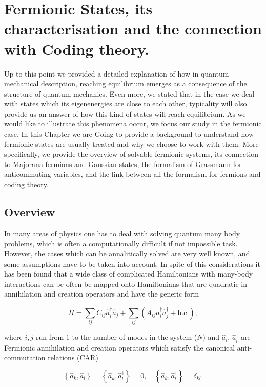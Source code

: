 \chapter{ Fermionic States, its characterisation and the connection with Coding theory.}
Up to this point we provided a detailed explanation of how in quantum mechanical description, reaching equilibrium emerges as a consequence of the structure of quantum mechanics. Even more, we stated that in the case we deal with states which its eigenenergies are close to each other, typicality will also provide us an answer of how this kind of states will reach equilibrium. As we would like to illustrate this phenomena occur, we focus our study in the fermionic case. In this Chapter we are Going to provide a background to understand how fermionic states are usually treated and why we choose to work with them. More specifically, we provide the overview of solvable fermionic systems, its connection to Majorana fermions and Gaussian states, the formalism of Grassmann for anticommuting variables, and the link between all the formalism for fermions and coding theory.\\
\section{Overview}
In many areas of physics one has to deal with solving quantum many body problems, which is often a computationally difficult if not impossible task. However, the cases which can be annalitically solved are very well known, and some assumptions have to be taken into account. In spite of this considerations it has been found that a wide class of complicated Hamiltonians with many-body interactions can be often be mapped onto Hamiltonians that are quadratic in annihilation and creation operators and have the generic form \cite{botero_bcs-like_2004}

\begin{equation}
\hat{H}=\sum_{i j} C_{i j} \hat{a}_{i}^{\dagger} \hat{a}_{j}+\sum_{i j}\left(A_{i j} \hat{a}_{i}^{\dagger}\hat{a}_{j}^{\dagger}+\mathrm{h.c.}\right),
\label{CH2:QuadraticHamiltonian}
\end{equation}

where $i,j$ run from $1$ to the number of modes in the system ($N$) and $\hat{a}_i$, $\hat{a}^{\dagger}_i$ are Fermionic annihilation and creation operators which satisfy the canonical anti-commutation relations (CAR)\cite{fradkin_field_1997}

\begin{equation}
\left\{\hat{a}_{k}, \hat{a}_{l}\right\}=\left\{\hat{a}_{k}^{\dagger}, \hat{a}_{l}^{\dagger}\right\}=0, \quad\left\{\hat{a}_{k}, \hat{a}_{l}^{\dagger}\right\}=\delta_{k l}.
\label{CH2:Anticommutation}
\end{equation}

